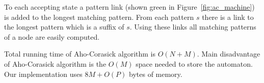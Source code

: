 \documentclass[final]{beamer}
\begin{document}
\begin{poster}
To each accepting state a pattern link (shown green in Figure~\ref{fig:ac_machine})
is added to the longest matching pattern.
From each pattern $s$ there is a link to the longest pattern which
is a suffix of $s$.
Using these links all matching patterns of a node are easily
computed.

Total running time of Aho-Corasick algorithm is $O(N+M)$.
Main disadvantage of Aho-Corasick algorithm is the $O(M)$ space needed to store the automaton.
Our implementation uses $8M+O(P)$ bytes of memory.

%


%
\vspace{5mm}


\end{poster}
\end{document}
